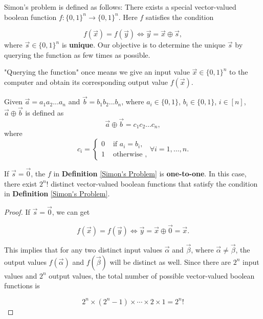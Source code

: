 \begin{definition}\label{Simon's Problem}
Simon's \cite{simon1997power} problem is defined as follows: There exists a special vector-valued boolean function $f:\{0,1\}^n \rightarrow\{0,1\}^n$. Here $f$ satisfies the condition

$$
f(\vec{x})=f(\vec{y}) \iff \vec{y}=\vec{x}\oplus \vec{s},
$$ 
where $\vec{s}\in\{0,1\}^n$ is \textbf{unique}. Our objective is to determine the unique $\vec{s}$ by querying the function as few times as possible.
\end{definition}

\begin{remark}
"Querying the function" once means we give an input value $\vec{x} \in \{0,1\}^n$ to the computer and obtain its corresponding output value $f(\vec{x})$.
\end{remark}
	
\begin{mdframed}
	Given $\vec{a}=a_1a_2...a_n$ and $\vec{b}=b_1b_2...b_n$, where $a_i\in\{0,1\}$, $b_i\in\{0,1\}$, $i\in[n]$, $\vec{a}\oplus \vec{b}$ is defined as   
	\[
	\vec{a}\oplus \vec{b}=c_1c_2...c_n,
	\]
	where
	$$
	c_i=\left\{\begin{array}{ll}
		0 & \text { if } a_i = b_i, \\
		1 & \text { otherwise },
	\end{array} \forall i=1, \ldots, n.\right.
	$$
\end{mdframed}

	
\begin{property}
If $\vec{s}=\vec{0}$, the $f$ in \textbf{Definition} \ref{Simon's Problem} is \textbf{one-to-one}. In this case, there exist $2^n !$ distinct vector-valued boolean functions that satisfy the condition in \textbf{Definition} \ref{Simon's Problem}.
\end{property}

\begin{proof}
If $\vec{s} = \vec{0}$, we can get

$$
f(\vec{x})=f(\vec{y}) \iff \vec{y}=\vec{x}\oplus \vec{0} = \vec{x}.
$$

This implies that for any two distinct input values $\vec{\alpha}$ and $\vec{\beta}$, where $\vec{\alpha} \neq \vec{\beta}$, the output values $f(\vec{\alpha})$ and $f(\vec{\beta})$ will be distinct as well. Since there are $2^n$ input values and $2^n$ output values, the total number of possible vector-valued boolean functions is

$$
2^n \times (2^n-1) \times \cdots \times 2 \times 1 = 2^n!
$$
\end{proof}

